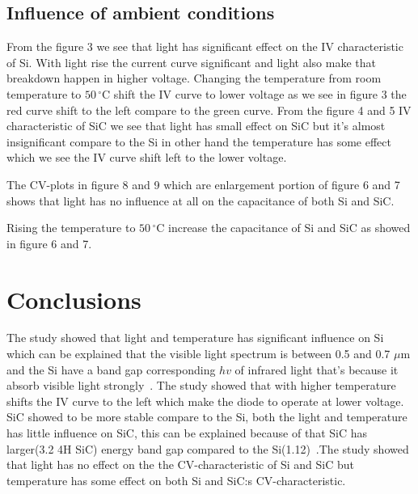 \documentclass[letterpaper,12pt]{article}
\begin{document}
\begin{minipage}{\linewidth}%
\label{visina8}%
\end{minipage}
\subsection{Influence of ambient conditions}
From the figure 3 we see that light has significant effect on the IV characteristic of Si. With light rise the current curve significant and light also make that breakdown happen in higher voltage. Changing the temperature from room temperature to $50\,^{\circ}\mathrm{C}$ shift the IV curve to lower voltage as we see in figure 3 the red curve shift to the left compare to the green curve.
From the figure 4 and 5 IV characteristic of SiC we see that light has small effect on SiC but it's almost insignificant compare to the Si in other hand the temperature has some effect which we see the IV curve shift left to the lower voltage.

The CV-plots in figure 8 and 9 which are enlargement portion of figure 6 and 7 shows that light has no influence at all on the capacitance of both Si and SiC.

Rising the temperature to $50\,^{\circ}\mathrm{C}$ increase the capacitance of Si and SiC as showed in figure 6 and 7.


\section{Conclusions}
The study showed that light and temperature has significant influence on Si which can be explained that the visible light spectrum is between 0.5 and 0.7 $\mu$m and the Si have a band gap corresponding $hv$ of infrared light that's because it absorb visible light strongly~\cite{hu}. The study showed that with higher temperature shifts the IV curve to the left which make the diode to operate at lower voltage. SiC showed to be more stable compare to the Si, both the light and temperature has little influence on SiC, this can be explained because of that SiC has larger(3.2 4H SiC) energy band gap compared to the Si(1.12)~\cite{sic}.The study showed that light has no effect on the the CV-characteristic of Si and SiC but temperature has some effect on both Si and SiC:s CV-characteristic.
\end{document}
